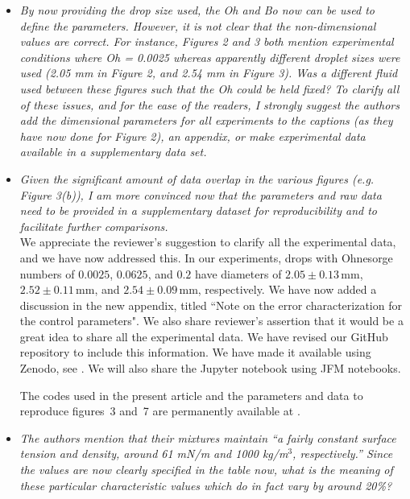\documentclass[]{article}
\newcommand{\oo}{\color{magenta} \normalfont}
\newcommand{\bb}{\color{black} \normalfont}
\begin{document}
\begin{enumerate}
\begin{itemize}
		\item \textit{By now providing the drop size used, the Oh and Bo now can be used to define the parameters. However, it is not clear that the non-dimensional values are correct. For instance, Figures 2 and 3 both mention experimental conditions where Oh = 0.0025 whereas apparently different droplet sizes were used (2.05 mm in Figure 2, and 2.54 mm in Figure 3). Was a different fluid used between these figures such that the Oh could be held fixed? To clarify all of these issues, and for the ease of the readers, I strongly suggest the authors add the dimensional parameters for all experiments to the captions (as they have now done for Figure 2), an appendix, or make experimental data available in a supplementary data set.}	
		
		\item \textit{Given the significant amount of data overlap in the various figures (e.g. Figure 3(b)), I am more convinced now that the parameters and raw data need to be provided in a supplementary dataset for reproducibility and to facilitate further comparisons.}\\[1mm]
		
		We appreciate the reviewer's suggestion to clarify all the experimental data, and we have now addressed this. In our experiments, drops with Ohnesorge numbers of $0.0025$, $0.0625$, and $0.2$ have diameters of $2.05 \pm 0.13\,\si{\milli\meter}$, $2.52 \pm 0.11\,\si{\milli\meter}$, and $2.54 \pm 0.09\,\si{\milli\meter}$, respectively. We have now added a discussion in the new appendix, titled ``Note on the error characterization for the control parameters". 
		We also share reviewer's assertion that it would be a great idea to share all the experimental data. We have revised our GitHub repository to include this information. We have made it available using Zenodo, see \citet{basiliskVatsal}. We will also share the Jupyter notebook using JFM notebooks. 
		
		\oo
		 The codes used in the present article and the parameters and data to reproduce figures~3 and~7 are permanently available at \citet{basiliskVatsal}.\\
		\bb
		
		\item \textit{The authors mention that their mixtures maintain ``a fairly constant surface tension and density, around 61 mN/m and 1000 kg/m$^3$, respectively.'' Since the values are now clearly specified in the table now, what is the meaning of these particular characteristic values which do in fact vary by around 20\%?}\\[1mm]
		

\end{itemize}
\end{enumerate}
\end{document}
